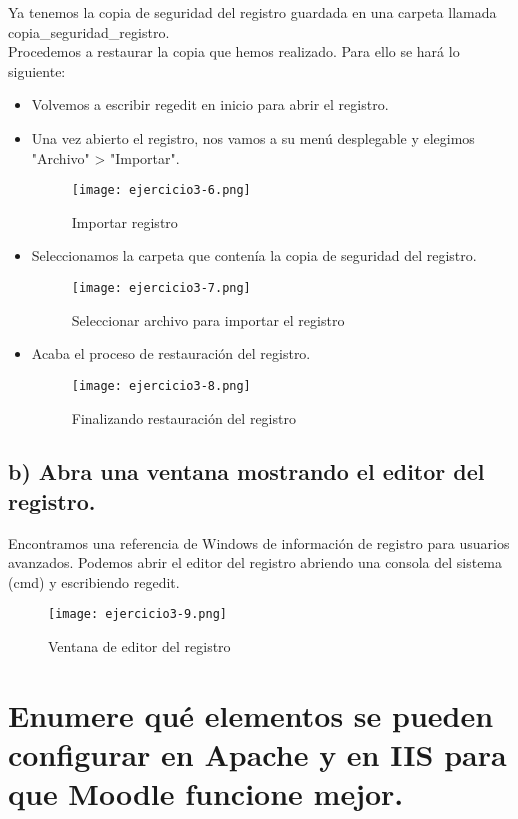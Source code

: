 	Ya tenemos la copia de seguridad del registro guardada en una carpeta llamada copia\_seguridad\_registro.\\
	
	Procedemos a restaurar la copia que hemos realizado. Para ello se hará lo siguiente:
	\begin{itemize}
		\item Volvemos a escribir regedit en inicio para abrir el registro.
		\item Una vez abierto el registro, nos vamos a su menú desplegable y elegimos "Archivo" > "Importar".
			\begin{figure}[H] 
				\centering
				\texttt{[image: ejercicio3-6.png]} 
				\label{figura17} 
				\caption{Importar registro}
			\end{figure}
		\item Seleccionamos la carpeta que contenía la copia de seguridad del registro.
			\begin{figure}[H] 
				\centering
				\texttt{[image: ejercicio3-7.png]} 
				\label{figura18} 
				\caption{Seleccionar archivo para importar el registro}
			\end{figure}
		\item Acaba el proceso de restauración del registro.
			\begin{figure}[H] 
				\centering
				\texttt{[image: ejercicio3-8.png]} 
				\label{figura19} 
				\caption{Finalizando restauración del registro}
			\end{figure}
		
	\end{itemize}
	\subsection{b) Abra una ventana mostrando el editor del registro.}
	
	Encontramos una referencia de Windows de información de registro para usuarios avanzados\cite{ejercicio3-2}. Podemos abrir el editor del registro abriendo una consola del sistema (cmd) y escribiendo regedit.
	
	\begin{figure}[H] 
		\centering
		\texttt{[image: ejercicio3-9.png]} 
		\label{figura20} 
		\caption{Ventana de editor del registro}
	\end{figure}
	
	\section{Enumere qué elementos se pueden configurar en Apache y en IIS para que Moodle funcione mejor.}
	
